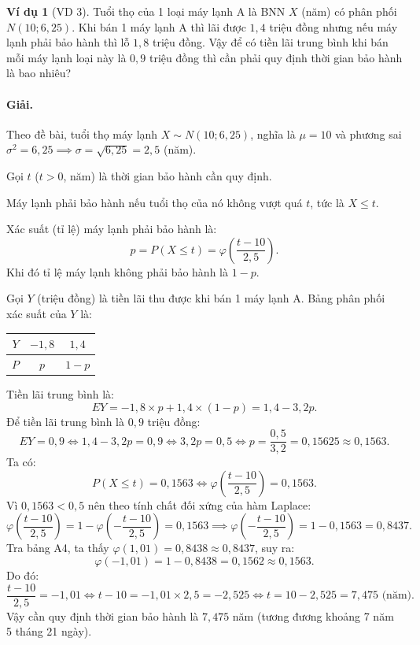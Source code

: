 \documentclass[12pt,a4paper]{article}
\theoremstyle{definition}
\newtheorem{vidu}{Ví dụ}[section]
\begin{document}
\begin{vidu}[VD 3]
Tuổi thọ của 1 loại máy lạnh A là BNN $X$ (năm) có phân phối $N(10; 6{,}25)$. Khi bán 1 máy lạnh A thì lãi được $1{,}4$ triệu đồng nhưng nếu máy lạnh phải bảo hành thì lỗ $1{,}8$ triệu đồng. Vậy để có tiền lãi trung bình khi bán mỗi máy lạnh loại này là $0{,}9$ triệu đồng thì cần phải quy định thời gian bảo hành là bao nhiêu?

\paragraph{Giải.}
Theo đề bài, tuổi thọ máy lạnh $X \sim N(10; 6{,}25)$, nghĩa là $\mu = 10$ và phương sai $\sigma^2 = 6{,}25 \implies \sigma = \sqrt{6{,}25} = 2{,}5$ (năm).

Gọi $t$ ($t > 0$, năm) là thời gian bảo hành cần quy định.

Máy lạnh phải bảo hành nếu tuổi thọ của nó không vượt quá $t$, tức là $X \le t$.

Xác suất (tỉ lệ) máy lạnh phải bảo hành là:
\[
p = P(X \le t) = \varphi\left(\frac{t - 10}{2{,}5}\right).
\]
Khi đó tỉ lệ máy lạnh không phải bảo hành là $1 - p$.

Gọi $Y$ (triệu đồng) là tiền lãi thu được khi bán 1 máy lạnh A. Bảng phân phối xác suất của $Y$ là:
\begin{center}
\renewcommand{\arraystretch}{1.3}
\begin{tabular}{|c|c|c|}
\hline
$Y$ & $-1{,}8$ & $1{,}4$ \\
\hline
$P$ & $p$ & $1 - p$ \\
\hline
\end{tabular}
\end{center}
Tiền lãi trung bình là:
\[
EY = -1{,}8 \times p + 1{,}4 \times (1 - p) = 1{,}4 - 3{,}2p.
\]
Để tiền lãi trung bình là $0{,}9$ triệu đồng:
\[
EY = 0{,}9 \iff 1{,}4 - 3{,}2p = 0{,}9 \iff 3{,}2p = 0{,}5 \iff p = \frac{0{,}5}{3{,}2} = 0{,}15625 \approx 0{,}1563.
\]
Ta có:
\[
P(X \le t) = 0{,}1563 \iff \varphi\left(\frac{t - 10}{2{,}5}\right) = 0{,}1563.
\]
Vì $0{,}1563 < 0{,}5$ nên theo tính chất đối xứng của hàm Laplace:
\[
\varphi\left(\frac{t - 10}{2{,}5}\right) = 1 - \varphi\left(-\frac{t - 10}{2{,}5}\right) = 0{,}1563 \implies \varphi\left(-\frac{t - 10}{2{,}5}\right) = 1 - 0{,}1563 = 0{,}8437.
\]
Tra bảng A4, ta thấy $\varphi(1{,}01) = 0{,}8438 \approx 0{,}8437$, suy ra:
\[
\varphi(-1{,}01) = 1 - 0{,}8438 = 0{,}1562 \approx 0{,}1563.
\]
Do đó:
\[
\frac{t - 10}{2{,}5} = -1{,}01 \iff t - 10 = -1{,}01 \times 2{,}5 = -2{,}525 \iff t = 10 - 2{,}525 = 7{,}475 \text{ (năm)}.
\]
Vậy cần quy định thời gian bảo hành là $7{,}475$ năm (tương đương khoảng 7 năm 5 tháng 21 ngày).
\end{vidu}
\end{document}
